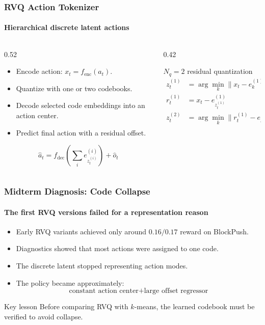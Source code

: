\documentclass[aspectratio=169]{ctexbeamer}
\begin{document}
\begin{frame}
  \frametitle{RVQ Action Tokenizer}
  \framesubtitle{Hierarchical discrete latent actions}
  \begin{columns}[T]
    \begin{column}{0.52\textwidth}
      \begin{itemize}
        \item Encode action: $x_t=f_{\mathrm{enc}}(a_t)$.
        \item Quantize with one or two codebooks.
        \item Decode selected code embeddings into an action center.
        \item Predict final action with a residual offset.
      \end{itemize}
      \begin{equation*}
        \hat{a}_t = f_{\mathrm{dec}}\left(\sum_i e_{z_t^{(i)}}^{(i)}\right) + \hat{o}_t
      \end{equation*}
    \end{column}
    \begin{column}{0.42\textwidth}
      \begin{block}{$N_q=2$ residual quantization}
      \begin{align*}
        z_t^{(1)} &= \arg\min_k \|x_t-e_k^{(1)}\|_2^2 \\
        r_t^{(1)} &= x_t-e_{z_t^{(1)}}^{(1)} \\
        z_t^{(2)} &= \arg\min_k \|r_t^{(1)}-e_k^{(2)}\|_2^2
      \end{align*}
      \end{block}
    \end{column}
  \end{columns}
\end{frame}

\begin{frame}
  \frametitle{Midterm Diagnosis: Code Collapse}
  \framesubtitle{The first RVQ versions failed for a representation reason}
  \begin{itemize}
    \item Early RVQ variants achieved only around $0.16/0.17$ reward on BlockPush.
    \item Diagnostics showed that most actions were assigned to one code.
    \item The discrete latent stopped representing action modes.
    \item The policy became approximately:
    \begin{equation*}
      \text{constant action center} + \text{large offset regressor}
    \end{equation*}
  \end{itemize}
  \begin{alertblock}{Key lesson}
    Before comparing RVQ with $k$-means, the learned codebook must be verified to avoid collapse.
  \end{alertblock}
\end{frame}
\end{document}
